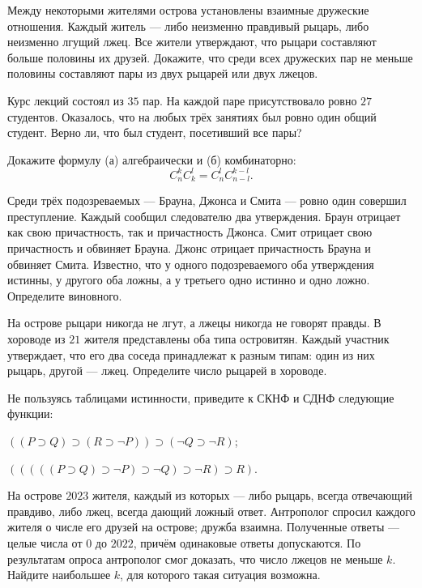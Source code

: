 \begin{problems}
\item Между некоторыми жителями острова установлены взаимные дружеские
отношения. Каждый житель --- либо неизменно правдивый рыцарь, либо
неизменно лгущий лжец. Все жители утверждают, что рыцари составляют
больше половины их друзей. Докажите, что среди всех дружеских пар
не меньше половины составляют пары из двух рыцарей или двух лжецов.

\item Курс лекций состоял из $35$ пар. На каждой паре присутствовало ровно $27$ студентов. Оказалось, что на любых трёх занятиях был ровно один общий студент. Верно ли, что был студент, посетивший все пары?

\item Докажите формулу (а) алгебраически и (б) комбинаторно:
\[
  C_n^k C_k^l = C_n^l C_{n-l}^{k-l}.
\]

\item Среди трёх подозреваемых --- Брауна, Джонса и Смита --- ровно один
совершил преступление. Каждый сообщил следователю два утверждения.
Браун отрицает как свою причастность, так и причастность Джонса.
Смит отрицает свою причастность и обвиняет Брауна.
Джонс отрицает причастность Брауна и обвиняет Смита.
Известно, что у одного подозреваемого оба утверждения истинны,
у другого оба ложны, а у третьего одно истинно и одно ложно.
Определите виновного.

\item На острове рыцари никогда не лгут, а лжецы никогда не говорят правды.
В хороводе из $21$ жителя представлены оба типа островитян.
Каждый участник утверждает, что его два соседа принадлежат к разным типам:
один из них рыцарь, другой --- лжец. Определите число рыцарей в хороводе.

\item Не пользуясь таблицами истинности, приведите к СКНФ и СДНФ следующие функции:
\begin{parts}
  \item $((P\supset Q)\supset(R\supset\neg P))\supset(\neg Q\supset\neg R)$;
  \item $(((((P\supset Q)\supset\neg P)\supset\neg Q)\supset\neg R)\supset R)$.
\end{parts}

\item На острове $2023$ жителя, каждый из которых --- либо рыцарь,
всегда отвечающий правдиво, либо лжец, всегда дающий ложный ответ.
Антрополог спросил каждого жителя о числе его друзей на острове;
дружба взаимна. Полученные ответы --- целые числа от $0$ до $2022$,
причём одинаковые ответы допускаются. По результатам опроса антрополог
смог доказать, что число лжецов не меньше $k$. Найдите наибольшее $k$,
для которого такая ситуация возможна.


\end{problems}
